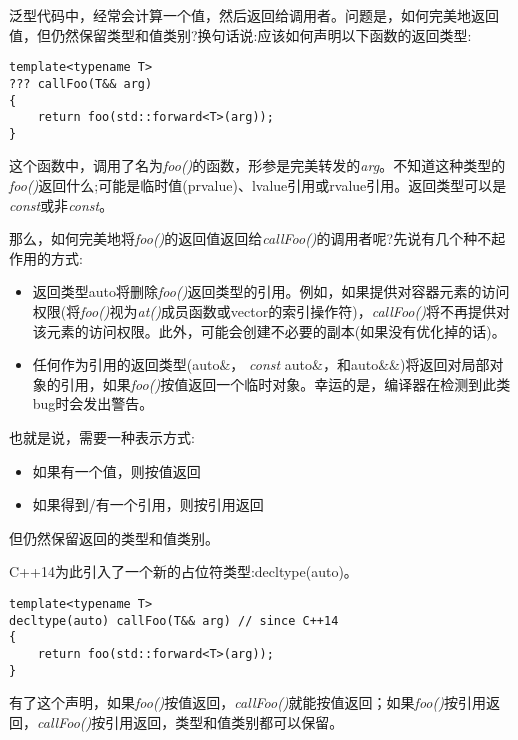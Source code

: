 泛型代码中，经常会计算一个值，然后返回给调用者。问题是，如何完美地返回值，但仍然保留类型和值类别?换句话说:应该如何声明以下函数的返回类型:\par

\begin{lstlisting}[caption={}]
template<typename T>
??? callFoo(T&& arg)
{
	return foo(std::forward<T>(arg));
}
\end{lstlisting}

这个函数中，调用了名为\textit{foo()}的函数，形参是完美转发的\textit{arg}。不知道这种类型的\textit{foo()}返回什么;可能是临时值(prvalue)、lvalue引用或rvalue引用。返回类型可以是\textit{const}或非\textit{const}。\par

那么，如何完美地将\textit{foo()}的返回值返回给\textit{callFoo()}的调用者呢?先说有几个种不起作用的方式:\par

\begin{itemize}
	\item 返回类型auto将删除\textit{foo()}返回类型的引用。例如，如果提供对容器元素的访问权限(将\textit{foo()}视为\textit{at()}成员函数或vector的索引操作符)，\textit{callFoo()}将不再提供对该元素的访问权限。此外，可能会创建不必要的副本(如果没有优化掉的话)。
	\item 任何作为引用的返回类型(auto\&， \textit{const} auto\&，和auto\&\&)将返回对局部对象的引用，如果\textit{foo()}按值返回一个临时对象。幸运的是，编译器在检测到此类bug时会发出警告。
\end{itemize}

也就是说，需要一种表示方式:\par

\begin{itemize}
	\item 如果有一个值，则按值返回
	\item 如果得到/有一个引用，则按引用返回
\end{itemize}

但仍然保留返回的类型和值类别。\par

C++14为此引入了一个新的占位符类型:decltype(auto)。\par

\begin{lstlisting}[caption={}]
template<typename T>
decltype(auto) callFoo(T&& arg) // since C++14
{
	return foo(std::forward<T>(arg));
}
\end{lstlisting}

有了这个声明，如果\textit{foo()}按值返回，\textit{callFoo()}就能按值返回；如果\textit{foo()}按引用返回，\textit{callFoo()}按引用返回，类型和值类别都可以保留。\par











































